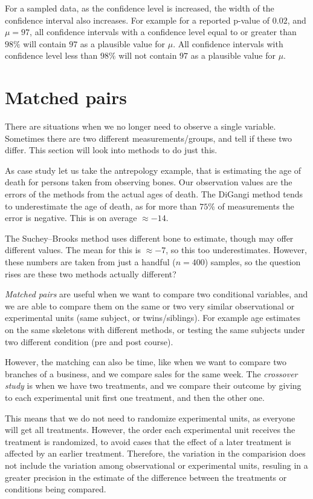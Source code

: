 For a sampled data, as the confidence level is increased, the width of the
confidence interval also increases. For example for a reported p-value of
$0.02$, and $\mu=97$, all confidence intervals with a confidence level equal to
or greater than $98\%$ will contain $97$ as a plausible value for $\mu$. All
confidence intervals with confidence level less than $98\%$ will not contain
$97$ as a plausible value for $\mu$.

\section{Matched pairs}

There are situations when we no longer need to observe a single variable.
Sometimes there are two different measurements/groups, and tell if these two
differ. This section will look into methods to do just this.

As case study let us take the antrepology example, that is estimating the age
of death for persons taken from observing bones. Our observation values are the
errors of the methods from the actual ages of death. The DiGangi method tends to
underestimate the age of death, as for more than $75\%$ of measurements the
error is negative. This is on average $\approx -14$.

The Suchey--Brooks method uses different bone to estimate, though may offer
different values. The mean for this is $\approx -7$, so this too underestimates.
However, these numbers are taken from just a handful ($n=400$) samples, so the
question rises are these two methods actually different?

\emph{Matched pairs} are useful when we want to compare two conditional
variables, and we are able to compare them on the same or two very similar
observational or experimental units (same subject, or twins/siblings). For
example age estimates on the same skeletons with different methods, or testing
the same subjects under two different condition (pre and post course).

However, the matching can also be time, like when we want to compare two
branches of a business, and we compare sales for the same week. The
\emph{crossover study} is when we have two treatments, and we compare their
outcome by giving to each experimental unit first one treatment, and then the
other one.

This means that we do not need to randomize experimental units, as
everyone will get all treatments. However, the order each experimental unit
receives the treatment is randomized, to avoid cases that the effect of a later
treatment is affected by an earlier treatment. Therefore, the variation in the
comparision does not include the variation among observational or experimental
units, resuling in a greater precision in the estimate of the difference between
the treatments or conditions being compared.

